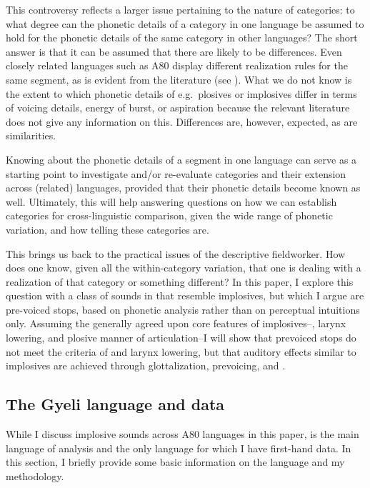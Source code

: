 \documentclass[output=paper]{LSP/langsci}
\begin{document}
This controversy reflects a larger issue pertaining to the nature of categories: to what degree can the phonetic details of a category in one language be assumed to hold for the phonetic details of the same category in other languages?  The short answer is that it can be assumed that there are likely to be differences.  Even closely related languages such as  A80 display different realization rules for the same segment, as is evident from the literature (see ). What we do not know is the extent to which phonetic details of e.g.\ plosives or implosives differ in terms of voicing details, energy of burst, or aspiration because the relevant literature does not give any information on this. Differences are, however, expected, as are similarities.

Knowing about the phonetic details of a segment in one language can serve as a starting point to investigate and/or re-evaluate categories and their extension across (related) languages, provided that their phonetic details become known as well. Ultimately, this will help answering questions on how we can establish categories for cross-linguistic comparison, given the wide range of phonetic variation, and how telling these categories are.

This brings us back to the practical issues of the descriptive fieldworker. How does one know, given all the within-category variation, that one is dealing with a realization of that category or something  different? In this paper, I explore this question with a class of sounds in  that resemble implosives, but which I argue are pre-voiced stops, based on phonetic analysis rather than on perceptual intuitions only. Assuming the generally agreed upon core features of implosives--, larynx lowering, and plosive manner of articulation--I will show that  prevoiced stops do not meet the criteria of  and larynx lowering, but that auditory effects similar to implosives are achieved through glottalization, prevoicing, and .






\subsection{The Gyeli language and data}
\label{sec:grimm:1.2}

While I discuss implosive sounds across  A80 languages in this paper,  is the main language of analysis and the only language for which I have first-hand data. In this section, I briefly provide some basic information on the language and my methodology.
   
\end{document}
